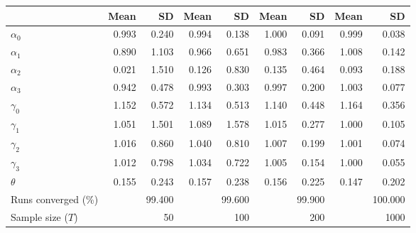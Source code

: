
\begin{tabular}[t]{lrrrrrrrr}
\toprule
  & Mean & SD & Mean  & SD  & Mean   & SD   & Mean    & SD   \\
\midrule
$\alpha_{0}$ & 0.993 & 0.240 & 0.994 & 0.138 & 1.000 & 0.091 & 0.999 & 0.038\\
$\alpha_{1}$ & 0.890 & 1.103 & 0.966 & 0.651 & 0.983 & 0.366 & 1.008 & 0.142\\
$\alpha_{2}$ & 0.021 & 1.510 & 0.126 & 0.830 & 0.135 & 0.464 & 0.093 & 0.188\\
$\alpha_{3}$ & 0.942 & 0.478 & 0.993 & 0.303 & 0.997 & 0.200 & 1.003 & 0.077\\
$\gamma_{0}$ & 1.152 & 0.572 & 1.134 & 0.513 & 1.140 & 0.448 & 1.164 & 0.356\\
$\gamma_{1}$ & 1.051 & 1.501 & 1.089 & 1.578 & 1.015 & 0.277 & 1.000 & 0.105\\
$\gamma_{2}$ & 1.016 & 0.860 & 1.040 & 0.810 & 1.007 & 0.199 & 1.001 & 0.074\\
$\gamma_{3}$ & 1.012 & 0.798 & 1.034 & 0.722 & 1.005 & 0.154 & 1.000 & 0.055\\
$\theta$ & 0.155 & 0.243 & 0.157 & 0.238 & 0.156 & 0.225 & 0.147 & 0.202\\
Runs converged (\%) &  & 99.400 &  & 99.600 &  & 99.900 &  & 100.000\\
Sample size ($T$) &  & 50 &  & 100 &  & 200 &  & 1000\\
\bottomrule
\end{tabular}
